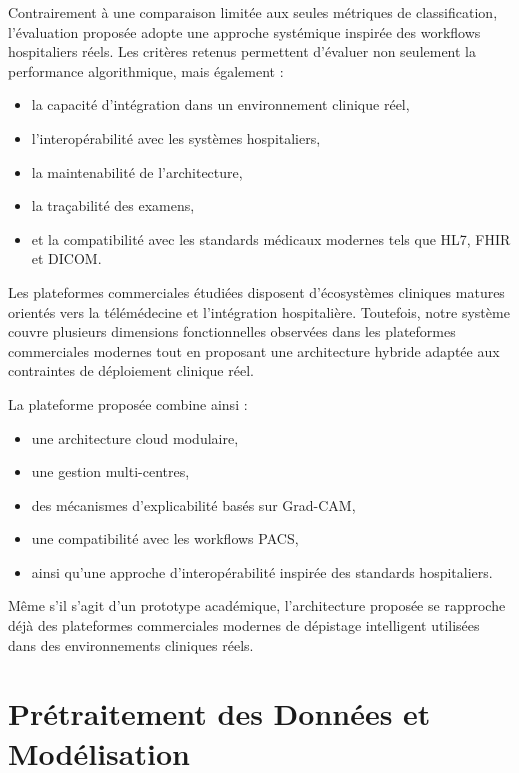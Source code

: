 \documentclass[12pt,a4paper,oneside]{report}
\begin{document}
Contrairement à une comparaison limitée aux seules métriques de classification, l'évaluation proposée adopte une approche systémique inspirée des workflows hospitaliers réels. Les critères retenus permettent d'évaluer non seulement la performance algorithmique, mais également :
\begin{itemize}
    \item la capacité d'intégration dans un environnement clinique réel,
    \item l'interopérabilité avec les systèmes hospitaliers,
    \item la maintenabilité de l'architecture,
    \item la traçabilité des examens,
    \item et la compatibilité avec les standards médicaux modernes tels que HL7, FHIR et DICOM.
\end{itemize}

Les plateformes commerciales étudiées disposent d'écosystèmes cliniques matures orientés vers la télémédecine et l'intégration hospitalière. Toutefois, notre système couvre plusieurs dimensions fonctionnelles observées dans les plateformes commerciales modernes tout en proposant une architecture hybride adaptée aux contraintes de déploiement clinique réel.

La plateforme proposée combine ainsi :
\begin{itemize}
    \item une architecture cloud modulaire,
    \item une gestion multi-centres,
    \item des mécanismes d'explicabilité basés sur Grad-CAM,
    \item une compatibilité avec les workflows PACS,
    \item ainsi qu'une approche d'interopérabilité inspirée des standards hospitaliers.
\end{itemize}

Même s'il s'agit d'un prototype académique, l'architecture proposée se rapproche déjà des plateformes commerciales modernes de dépistage intelligent utilisées dans des environnements cliniques réels.

\newpage

\chapter{Prétraitement des Données et Modélisation}
\end{document}

